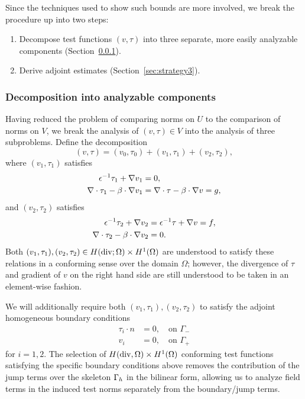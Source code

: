 Since the techniques used to show such bounds are more involved, we break the procedure up into two steps:
\begin{enumerate}
\item{}Decompose test functions $(v,\tau)$ into three separate, more easily analyzable components (Section~\ref{sec:strategy2}).
\item{}Derive adjoint estimates (Section~\ref{sec:strategy3}).
\end{enumerate}

\subsubsection{Decomposition into analyzable components}
\label{sec:strategy2}

Having reduced the problem of comparing norms on $U$ to the comparison of norms on $V$, we break the analysis of $\left(v,\tau\right) \in V$ into the analysis of three subproblems.  Define the decomposition
\[
\left(v,\tau\right) = \left(v_0,\tau_0\right) + \left(v_1,\tau_1\right) + \left(v_2,\tau_2\right),
\]
where $\left(v_1,\tau_1\right)$ satisfies 
\begin{align*}
\epsilon^{-1}\tau_1 + \grad v_1 &= 0 ,\\
\div \tau_1 - \beta\cdot \grad v_1 &=  \div \tau - \beta\cdot \grad v = g, 
\end{align*} 
and $\left(v_2,\tau_2\right)$ satisfies
\begin{align*}
\epsilon^{-1}\tau_2 + \grad v_2 &= \epsilon^{-1}\tau + \grad v = f, \\
\div \tau_2 - \beta\cdot \grad v_2 &= 0.
\end{align*}
Both $(v_1,\tau_1), (v_2,\tau_2) \in H({\rm div}; \Omega)\times H^1(\Omega)$ are understood to satisfy these relations in a conforming sense over the domain $\Omega$; however, the divergence of $\tau$ and gradient of $v$ on the right hand side are still understood to be taken in an element-wise fashion. 

We will additionally require both $\left(v_1,\tau_1\right), \left(v_2,\tau_2\right)$ to satisfy the adjoint homogeneous boundary conditions
\begin{align}
\tau_i\cdot n &= 0, \quad \text{on }\Gamma_- \label{bc_1}\\
v_i &= 0, \quad \text{on } \Gamma_+ \label{bc_2}
\end{align}
for $i = 1, 2$. The selection of $H({\rm div}, \Omega)\times H^1(\Omega)$ conforming test functions satisfying the specific boundary conditions above removes the contribution of the jump terms over the skeleton $\Gh$ in the bilinear form, allowing us to analyze field terms in the induced test norms separately from  the boundary/jump terms. 

